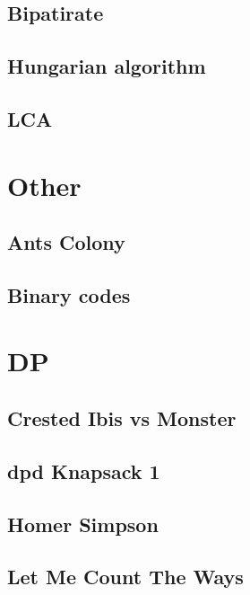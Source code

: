         \subsection{Bipatirate}
                
        \subsection{Hungarian algorithm}
                
        \subsection{LCA}
                

\section{Other}
        \subsection{Ants Colony}
                
        \subsection{Binary codes}        
                

\section{DP}
        \subsection{Crested Ibis vs Monster}
                
        \subsection{dpd Knapsack 1}
                
        \subsection{Homer Simpson}
                
        \subsection{Let Me Count The Ways}
                
